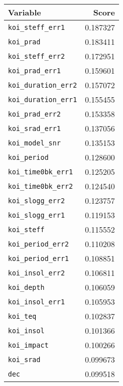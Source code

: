 \begin{tabular}{lr}
\toprule
                     Variable &     Score \\
\midrule
    \texttt{koi\_steff\_err1} &  0.187327 \\
           \texttt{koi\_prad} &  0.183411 \\
    \texttt{koi\_steff\_err2} &  0.172951 \\
     \texttt{koi\_prad\_err1} &  0.159601 \\
 \texttt{koi\_duration\_err2} &  0.157072 \\
 \texttt{koi\_duration\_err1} &  0.155455 \\
     \texttt{koi\_prad\_err2} &  0.153358 \\
     \texttt{koi\_srad\_err1} &  0.137056 \\
     \texttt{koi\_model\_snr} &  0.135153 \\
         \texttt{koi\_period} &  0.128600 \\
  \texttt{koi\_time0bk\_err1} &  0.125205 \\
  \texttt{koi\_time0bk\_err2} &  0.124540 \\
    \texttt{koi\_slogg\_err2} &  0.123757 \\
    \texttt{koi\_slogg\_err1} &  0.119153 \\
          \texttt{koi\_steff} &  0.115552 \\
   \texttt{koi\_period\_err2} &  0.110208 \\
   \texttt{koi\_period\_err1} &  0.108851 \\
    \texttt{koi\_insol\_err2} &  0.106811 \\
          \texttt{koi\_depth} &  0.106059 \\
    \texttt{koi\_insol\_err1} &  0.105953 \\
            \texttt{koi\_teq} &  0.102837 \\
          \texttt{koi\_insol} &  0.101366 \\
         \texttt{koi\_impact} &  0.100266 \\
           \texttt{koi\_srad} &  0.099673 \\
                 \texttt{dec} &  0.099518 \\
\bottomrule
\end{tabular}
